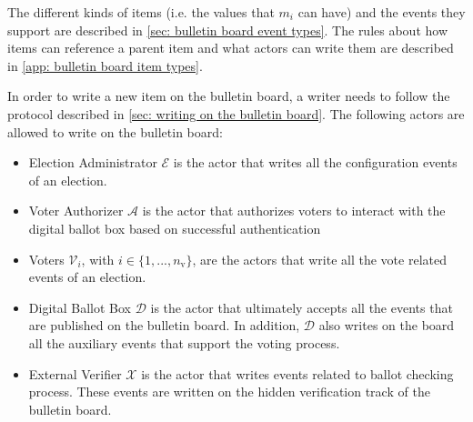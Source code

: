 \begin{algorithm}[ht]
    \DontPrintSemicolon
    \caption{$\mathsf{HistoryVer}(\boldsymbol{b}, h_0)$}

     
    \label{alg: history ver}
\end{algorithm}

The different kinds of items (i.e. the values that $m_i$ can have) and the events they support are described in \cref{sec: bulletin board event types}. The rules about how items can reference a parent item and what actors can write them are described in \cref{app: bulletin board item types}.

In order to write a new item on the bulletin board, a writer needs to follow the protocol described in \cref{sec: writing on the bulletin board}. The following actors are allowed to write on the bulletin board:
\begin{itemize}
    \item Election Administrator $\mathcal{E}$ is the actor that writes all the configuration events of an election.
    \item Voter Authorizer $\mathcal{A}$ is the actor that authorizes voters to interact with the digital ballot box based on successful authentication
    \item Voters $\mathcal{V}_i$, with $i \in \{1, ..., n_\mathrm{v}\}$, are the actors that write all the vote related events of an election.
    \item Digital Ballot Box $\mathcal{D}$ is the actor that ultimately accepts all the events that are published on the bulletin board. In addition, $\mathcal{D}$ also writes on the board all the auxiliary events that support the voting process.
    \item External Verifier $\mathcal{X}$ is the actor that writes events related to ballot checking process. These events are written on the hidden verification track of the bulletin board.
\end{itemize}



